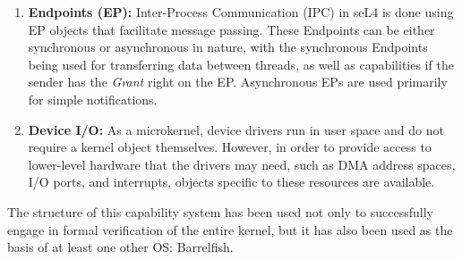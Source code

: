 \begin{enumerate}
\item {\bf Endpoints (EP):} Inter-Process Communication (IPC) in seL4 is done using EP objects that facilitate message passing. These Endpoints can be either synchronous or asynchronous in nature, with the synchronous Endpoints being used for transferring data between threads, as well as capabilities if the sender has the {\em Grant} right on the EP. Asynchronous EPs are used primarily for simple notifications.
\item {\bf Device I/O:} As a microkernel, device drivers run in user space and do not require a kernel object themselves. However, in order to provide access to lower-level hardware that the drivers may need, such as DMA address spaces, I/O ports, and interrupts, objects specific to these resources are available.
\end{enumerate}

The structure of this capability system has been used not only to successfully engage in formal verification of the entire kernel, but it has also been used as the basis of at least one other OS: Barrelfish.
